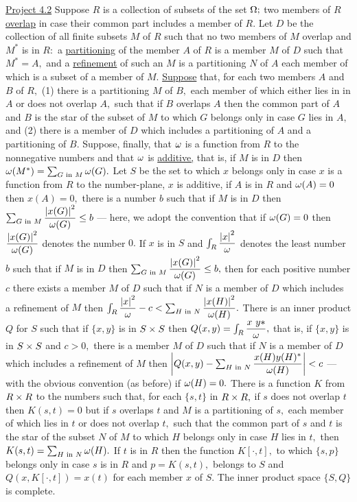 \underline{Project 4.2}  Suppose $R$ is a collection of subsets of the set $\Omega;$  two members of $R$ \underline{overlap} in case their common part includes a member of $R.$  Let $D$ be the collection of all finite subsets $M$ of $R$ such that no two members of $M$ overlap and $M^{*}$ is in $R:$ a \ul{partitioning} of the member $A$ of $R$ is a member $M$ of $D$ such that $M^{*} = A,$ and a \ul{refinement} of such an $M$ is a partitioning $N$ of $A$ each member of which is a subset of a member of $M.$  \ul{Suppose} that, for each two members $A$ and $B$ of $R,$\nl
(1) there is a partitioning $M$ of $B,$ each member of which either lies in in $A$ or does not overlap $A,$ such that if $B$ overlaps $A$ then the common part of $A$ and $B$ is the star of the subset of $M$ to which $G$ belongs only in case $G$ lies in $A,$ and \nl
(2) there is a member of $D$ which includes a partitioning of $A$ and a partitioning of $B.$  Suppose, finally, that $\omega$ is a function from $R$ to the nonnegative numbers and that $\omega$ is \ul{additive,} that is, if $M$ is in $D$ then $\omega(M^{*}) = \sum_{G \text{~in~}M}\omega(G).$  Let $S$ be the set to which $x$ belongs only in case $x$ is a function from $R$ to the number-plane, $x$ is additive, if $A$ is in $R$ and $\omega(A) = 0$ then $x(A) = 0,$ there is a number $b$ such that if $M$ is in $D$ then $\sum_{G\text{~in~}M}\dfrac{\left|x(G)\right|^{2}}{\omega(G)} \leq b$ ---  here, we adopt  the convention that if $\omega(G) = 0$ then $\dfrac{\left|x(G)\right|^{2}}{\omega(G)}$ denotes the number $0.$   If $x$ is in $S$ and $\int_{R}\dfrac{\left|x\right|^{2}}{\omega}$ denotes the least number $b$ such that if $M$ is in $D$ then  $\sum_{G\text{~in~}M}\dfrac{\left|x(G)\right|^{2}}{\omega(G)} \leq b,$ then for each positive number $c$ there exists a member $M$ of $D$ such that if $N$ is a member of $D$ which includes a refinement of $M$ then $\int_{R}\dfrac{\left|x\right|^{2}}{\omega} -c < \sum_{H\text{~in~}N}\dfrac{\left|x(H)\right|^{2}}{\omega(H)}.$  There is an inner product $Q$ for $S$ such that if $\{x,y\}$ is in $S \times S$ then $Q(x,y) = \int_{R}\dfrac{x~y{*}}{\omega},$  that is, if $\{x,y\}$ is in $S \times S$ and $c > 0,$ there is a member $M$ of $D$ such that if $N$ is a member of $D$ which includes a refinement of $M$ then $\left|Q(x,y) - \sum_{H\text{~in~}N} \dfrac{x(H)y(H)^{*}}{\omega(H)} \right| < c $ --- with the obvious convention (as before) if $\omega(H) = 0.$\nl
There is a function $K$ from $R \times R$ to the numbers such that, for each $\{s,t\}$ in $R \times R,$ if $s$ does not overlap $t$ then $K(s,t) = 0$ but if $s$ overlaps $t$ and $M$ is a partitioning of $s,$ each member of which lies in $t$ or does not overlap $t,$ such that the common part of $s$ and $t$ is the star of the subset $N$ of $M$ to which $H$ belongs only in case $H$ lies in $t,$ then $K(s,t) = \sum_{H\text{~in~}N}\omega(H).$   If $t$ is in $R$ then the function $K[\cdot,t],$ to which $\{s,p\}$ belongs only in case $s$ is in $R$ and $p = K(s,t),$ belongs to $S$ and $Q(x,K[\cdot,t]) = x(t)$ for each member $x$ of $S.$   The inner product space $\{S,Q\}$ is complete.\nl

